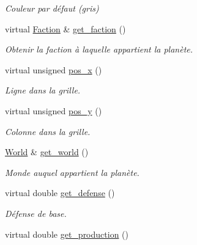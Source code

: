 \begin{DoxyCompactItemize}
\begin{DoxyCompactList}\small\item\em Couleur par défaut (gris) \end{DoxyCompactList}\item 
virtual \hyperlink{classFaction}{Faction} \& \hyperlink{classVirtual__planet_ac0d0e30029566b9113652c04ec2e6599}{get\-\_\-faction} ()
\begin{DoxyCompactList}\small\item\em Obtenir la faction à laquelle appartient la planète. \end{DoxyCompactList}\item 
\hypertarget{classVirtual__planet_acccedbd81a89f4ad75a6a5c1c09b044c}{virtual unsigned \hyperlink{classVirtual__planet_acccedbd81a89f4ad75a6a5c1c09b044c}{pos\-\_\-x} ()}\label{classVirtual__planet_acccedbd81a89f4ad75a6a5c1c09b044c}

\begin{DoxyCompactList}\small\item\em Ligne dans la grille. \end{DoxyCompactList}\item 
\hypertarget{classVirtual__planet_a3453bf12cb4d348aee6594c127ba6a56}{virtual unsigned \hyperlink{classVirtual__planet_a3453bf12cb4d348aee6594c127ba6a56}{pos\-\_\-y} ()}\label{classVirtual__planet_a3453bf12cb4d348aee6594c127ba6a56}

\begin{DoxyCompactList}\small\item\em Colonne dans la grille. \end{DoxyCompactList}\item 
\hypertarget{classVirtual__planet_a1d3474a2ca3833a770c3763884a84323}{\hyperlink{classWorld}{World} \& \hyperlink{classVirtual__planet_a1d3474a2ca3833a770c3763884a84323}{get\-\_\-world} ()}\label{classVirtual__planet_a1d3474a2ca3833a770c3763884a84323}

\begin{DoxyCompactList}\small\item\em Monde auquel appartient la planète. \end{DoxyCompactList}\item 
\hypertarget{classVirtual__planet_a25045d61c5ee29b94de56db88fa96f98}{virtual double \hyperlink{classVirtual__planet_a25045d61c5ee29b94de56db88fa96f98}{get\-\_\-defense} ()}\label{classVirtual__planet_a25045d61c5ee29b94de56db88fa96f98}

\begin{DoxyCompactList}\small\item\em Défense de base. \end{DoxyCompactList}\item 
\hypertarget{classVirtual__planet_a4294d3312671d720dca0b72a1648e6a4}{virtual double \hyperlink{classVirtual__planet_a4294d3312671d720dca0b72a1648e6a4}{get\-\_\-production} ()}\label{classVirtual__planet_a4294d3312671d720dca0b72a1648e6a4}


\end{DoxyCompactItemize}
